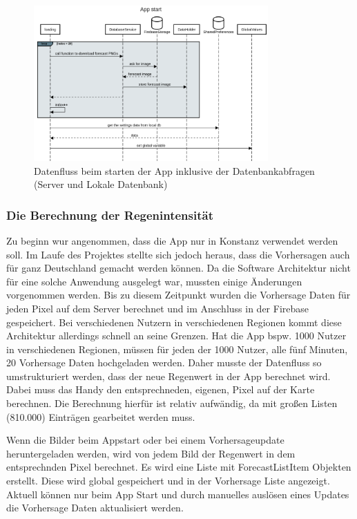\begin{figure}[H]
 \centering
 \includegraphics[width=0.8\textwidth,angle=0]{abb/sequence_diagram_app_start}
 \caption[Sequencediagram Appstart]{Datenfluss beim starten der App inklusive der Datenbankabfragen (Server und Lokale Datenbank)}
\label{fig:sequence_diagram_app_start}
\end{figure}

\subsubsection*{Die Berechnung der Regenintensität}
Zu beginn wur angenommen, dass die App nur in Konstanz verwendet werden soll. Im Laufe des Projektes stellte sich jedoch heraus, dass die Vorhersagen auch für ganz Deutschland gemacht werden können. Da die Software Architektur nicht für eine solche Anwendung ausgelegt war, mussten einige Änderungen vorgenommen werden. Bis zu diesem Zeitpunkt wurden die Vorhersage Daten für jeden Pixel auf dem Server berechnet und im Anschluss in der Firebase gespeichert. Bei verschiedenen Nutzern in verschiedenen Regionen kommt diese Architektur allerdings schnell an seine Grenzen. Hat die App bspw. 1000 Nutzer in verschiedenen Regionen, müssen für jeden der 1000 Nutzer, alle fünf Minuten, 20 Vorhersage Daten hochgeladen werden. Daher musste der Datenfluss so umstrukturiert werden, dass der neue Regenwert in der App berechnet wird. Dabei muss das Handy den entsprechneden, eigenen, Pixel auf der Karte berechnen. Die Berechnung hierfür ist relativ aufwändig, da mit großen Listen (810.000) Einträgen gearbeitet werden muss. 

Wenn die Bilder beim Appstart oder bei einem Vorhersageupdate heruntergeladen werden, wird von jedem Bild der Regenwert in dem entsprechnden Pixel berechnet. Es wird eine Liste mit ForecastListItem Objekten erstellt. Diese wird global gespeichert und in der Vorhersage Liste angezeigt. Aktuell können nur beim App Start und durch manuelles auslösen eines Updates die Vorhersage Daten aktualisiert werden.   

